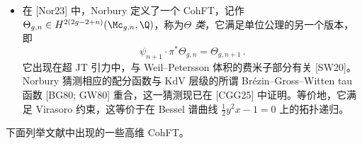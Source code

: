 \begin{example}[3.2]
\begin{itemize}
  它作为 $D$ 维时空的拓扑弦振幅的局部化公式中的顶点项出现。一个特别好的情形是 $D=3$ 以及参数 $(u_{1},u_{2},u_{3})$ 满足约束
  \begin{equation}
    \frac{1}{u_{1}}+\frac{1}{u_{2}}+\frac{1}{u_{3}}=0\,.
    \tag{3.18}
  \end{equation}
  在局部化公式的语境中，该约束对应于局部 Calabi--Yau 条件 [MV02; LLZ03; OP04]（参见 [Liu]）。与 Virasoro 约束/拓扑递归的联系，目前只知道 $D=1$ 以及带有 Calabi--Yau 条件的 $D=3$ 两种情形（见习题 3.5）。
  \item 在 [Nor23] 中，Norbury 定义了一个 CohFT，记作 $\Theta_{g,n}\in H^{2(2g-2+n)}(\Mc_{g,n},\Q)$，称为\emph{$\Theta$ 类}，它满足单位公理的另一个版本，即
  \begin{equation}
    \psi_{n+1}\cdot\pi^{*}\Theta_{g,n}=\Theta_{g,n+1}\,.
    \tag{3.19}
  \end{equation}
  它出现在超 JT 引力中，与 Weil--Petersson 体积的费米子部分有关 [SW20]。Norbury 猜测相应的配分函数与 KdV 层级的所谓 Br\'ezin--Gross--Witten tau 函数 [BG80; GW80] 重合，这一猜测现已在 [CGG25] 中证明。等价地，它满足 Virasoro 约束，这等价于在 Bessel 谱曲线 $\frac{1}{2}y^{2}x-1=0$ 上的拓扑递归。

\end{itemize}

下面列举文献中出现的一些高维 CohFT。



\end{example}
